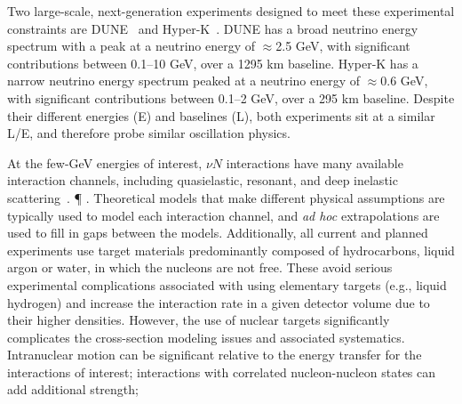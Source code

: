 \documentclass{ar-1col}
\newcommand{\change}[1]{{\color{red} #1}}
\def\asm#1{{\color{blue}#1}}
\def\del#1{}
\def\done#1{{\color{brown}#1}}
\begin{document}
Two\del{,} \done{large-scale}, next-generation experiments designed to meet these experimental constraints
are
DUNE~\cite{Abi:2020wmh}
and
Hyper-K~\cite{Hyper-Kamiokande:2018ofw}.
DUNE has a broad neutrino energy spectrum with a peak at a neutrino energy of $\approx$2.5 GeV,
with significant contributions between 0.1--10 GeV, over a 1295 km baseline.
Hyper-K has a narrow neutrino energy spectrum peaked at a neutrino energy of $\approx$0.6 GeV, with significant
contributions between 0.1--2 GeV, over a 295 km baseline. Despite their different energies (E) and
baselines (L), both experiments sit at a similar L/E, \del{so }\asm{and therefore }probe similar oscillation physics.%
\begin{marginnote}
\end{marginnote}%
At the few-GeV energies of interest, $\nu N$ interactions have many available interaction channels,
including quasielastic, resonant, and deep inelastic scattering~\cite{zeller12, hayato_review_2014, Mosel:2016cwa, Katori:2016yel, NuSTEC:2017hzk}.
\asm{\P}
\del{, and t}\asm{. T}\done{heoretical models \del{which}\asm{that} make different physical assumptions are typically used to model \del{them}\asm{each interaction channel}, \del{with}\asm{and} {\it ad hoc} extrapolation\asm{s are used} to fill in gaps between the models.}
\done{Additionally, all current and planned experiments use target materials predominantly composed of hydrocarbons, liquid argon or water, in which the nucleons are not free. These avoid serious experimental complications associated with using elementary targets (e.g., liquid hydrogen) and increase the interaction rate in a given detector volume due to their higher densities.}
\done{However, the use of nuclear targets significantly complicates the cross-section modeling issues and
  associated systematics\del{ in a number of ways}.}
\done{Intranuclear motion can be significant relative to the energy transfer \del{in}\asm{for} the interactions of interest;}
\change{interactions with correlated nucleon-nucleon states can add additional strength;}\asm{{\footnotesize\bf [are these always increases in strength?]}}%
\del{and rescattering of pions and nucleons in the nucleus confuse the relationship between the primary interaction channels and the observed particles in a detector, and change the fraction of energy lost to neutrons, which are typically unobserved in the detectors used.}
\end{document}
